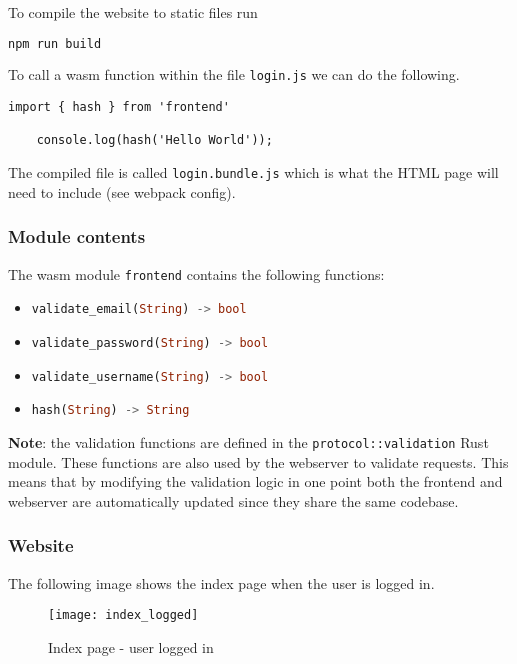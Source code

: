 \documentclass[../documentation.tex]{subfiles}
\begin{document}
To compile the website to static files run
\begin{lstlisting}[language=bash]
    npm run build
\end{lstlisting}

To call a wasm function within the file \texttt{login.js}
we can do the following.

\begin{lstlisting}[style=js]
    import { hash } from 'frontend'

    console.log(hash('Hello World'));
\end{lstlisting}

The compiled file is called \texttt{login.bundle.js}
which is what the HTML page will need to include (see webpack config).

\subsubsection{Module contents}

The wasm module \texttt{frontend} contains the following functions:
\begin{itemize}
    \item \lstinline[language=Rust]{validate_email(String) -> bool}
    \item \lstinline[language=Rust]{validate_password(String) -> bool}
    \item \lstinline[language=Rust]{validate_username(String) -> bool}
    \item \lstinline[language=Rust]{hash(String) -> String}
\end{itemize}

\textbf{\color{red} Note}: the validation functions are defined
in the \texttt{protocol::validation} Rust module. These functions
are also used by the webserver to validate requests.
This means that by modifying the validation logic in one point
both the frontend and webserver are automatically updated
since they share the same codebase.

\pagebreak

\subsubsection{Website}

The following image shows the index page when the user is logged in.

\begin{figure}[h]
    \centering
    \texttt{[image: index\_logged]}
    \caption{Index page - user logged in}
\end{figure}
\end{document}
